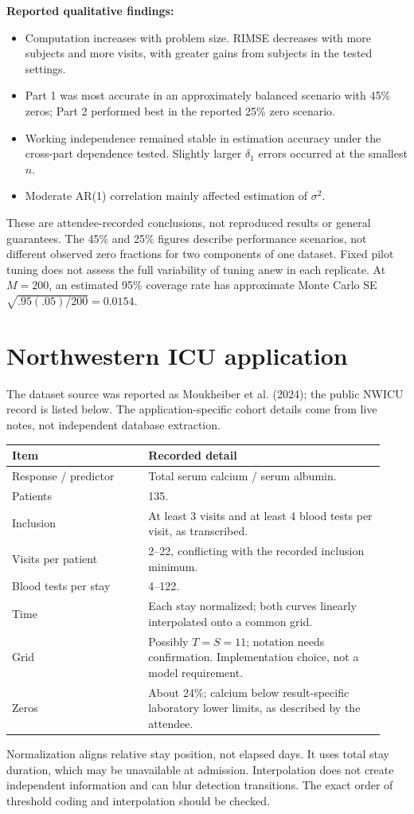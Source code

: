 \documentclass[11pt]{article}
\begin{document}
\textbf{Reported qualitative findings:}
\begin{itemize}
\item Computation increases with problem size. RIMSE decreases with more subjects and more visits, with greater gains from subjects in the tested settings.
\item Part 1 was most accurate in an approximately balanced scenario with 45\% zeros; Part 2 performed best in the reported 25\% zero scenario.
\item Working independence remained stable in estimation accuracy under the cross-part dependence tested. Slightly larger $\delta_1$ errors occurred at the smallest $n$.
\item Moderate AR(1) correlation mainly affected estimation of $\sigma^2$.
\end{itemize}
These are attendee-recorded conclusions, not reproduced results or general guarantees. The 45\% and 25\% figures describe performance scenarios, not different observed zero fractions for two components of one dataset. Fixed pilot tuning does not assess the full variability of tuning anew in each replicate. At $M=200$, an estimated 95\% coverage rate has approximate Monte Carlo SE $\sqrt{.95(.05)/200}=0.0154$.
\section{Northwestern ICU application}
The dataset source was reported as Moukheiber et al. (2024); the public NWICU record is listed below. The application-specific cohort details come from live notes, not independent database extraction.
\begin{longtable}{p{0.34\linewidth}p{0.59\linewidth}}
\toprule Item & Recorded detail\\\midrule
Response / predictor & Total serum calcium / serum albumin.\\
Patients & 135.\\
Inclusion & At least 3 visits and at least 4 blood tests per visit, as transcribed.\\
Visits per patient & 2--22, conflicting with the recorded inclusion minimum.\\
Blood tests per stay & 4--122.\\
Time & Each stay normalized; both curves linearly interpolated onto a common grid.\\
Grid & Possibly $T=S=11$; notation needs confirmation. Implementation choice, not a model requirement.\\
Zeros & About 24\%; calcium below result-specific laboratory lower limits, as described by the attendee.\\\bottomrule
\end{longtable}
Normalization aligns relative stay position, not elapsed days. It uses total stay duration, which may be unavailable at admission. Interpolation does not create independent information and can blur detection transitions. The exact order of threshold coding and interpolation should be checked.
\end{document}
